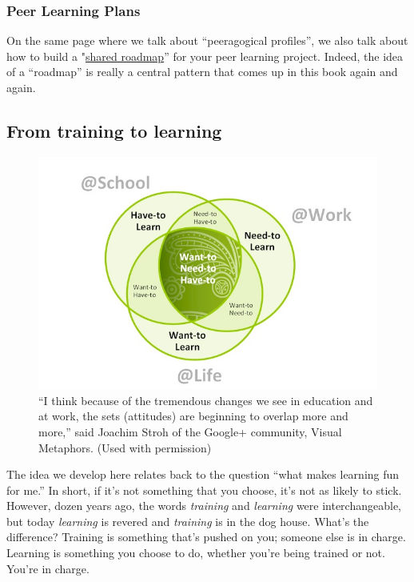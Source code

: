 \subsubsection{Peer Learning Plans}

On the same page where we talk about ``peeragogical profiles'', we also
talk about how to build a
"\href{http://peeragogy.org/patterns-usecases/patterns-and-heuristics/roadmap/}{shared
roadmap}'' for your peer learning project. Indeed, the idea of a
``roadmap'' is really a central pattern that comes up in this book again
and again.

\subsection{From training to learning}

\begin{figure}
\begin{center}
\includegraphics[width=.8\textwidth]{./pictures/learn.jpg}
\caption{``I think because of the tremendous changes we see in education and at
work, the sets (attitudes) are beginning to overlap more and more,''
said Joachim Stroh of the Google+ community, Visual Metaphors. (Used with permission)}
\end{center}
\end{figure}

The idea we develop here relates back to the question ``what makes
learning fun for me.'' In short, if it's not something that you choose,
it's not as likely to stick. However, dozen years ago, the words
\emph{training} and \emph{learning} were interchangeable, but today
\emph{learning} is revered and \emph{training} is in the dog house.
What's the difference? Training is something that's pushed on you;
someone else is in charge. Learning is something you choose to do,
whether you're being trained or not. You're in charge.

